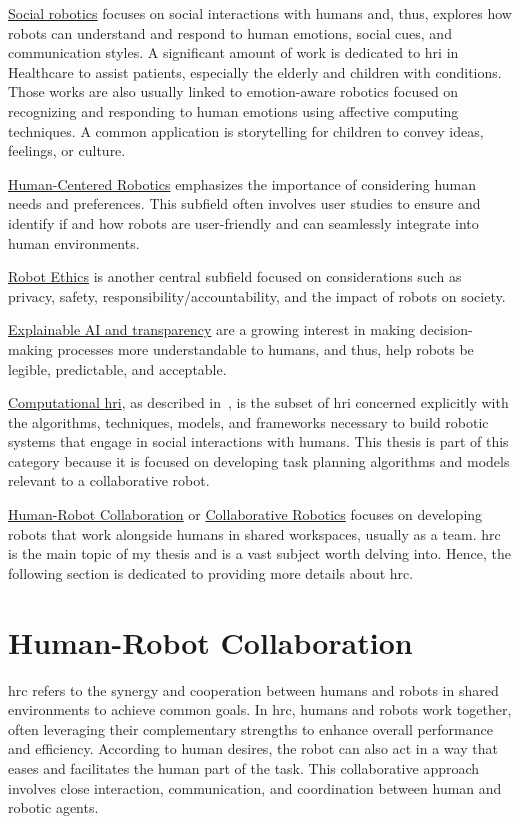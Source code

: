 \uline{Social robotics} focuses on social interactions with humans and, thus, explores how robots can understand and respond to human emotions, social cues, and communication styles.
A significant amount of work is dedicated to \acrshort{hri} in Healthcare to assist patients, especially the elderly and children with conditions. Those works are also usually linked to emotion-aware robotics focused on recognizing and responding to human emotions using affective computing techniques. A common application is storytelling for children to convey ideas, feelings, or culture. 

\uline{Human-Centered Robotics} emphasizes the importance of considering human needs and preferences. This subfield often involves user studies to ensure and identify if and how robots are user-friendly and can seamlessly integrate into human environments.

\uline{Robot Ethics} is another central subfield focused on considerations such as privacy, safety, responsibility/accountability, and the impact of robots on society.

\uline{Explainable AI and transparency} are a growing interest in making decision-making processes more understandable to humans, and thus, help robots be legible, predictable, and acceptable.

\uline{Computational \acrshort{hri}}, as described in~\cite{thomaz_computational_2016}, is the subset of \acrshort{hri} concerned explicitly with the algorithms, techniques, models, and frameworks necessary to build robotic systems that engage in social interactions with humans. This thesis is part of this category because it is focused on developing task planning algorithms and models relevant to a collaborative robot. 

\uline{Human-Robot Collaboration} or \uline{Collaborative Robotics} focuses on developing robots that work alongside humans in shared workspaces, usually as a team. \acrshort{hrc} is the main topic of my thesis and is a vast subject worth delving into. Hence, the following section is dedicated to providing more details about \acrshort{hrc}.

\section{Human-Robot Collaboration}

\acrfull{hrc} refers to the synergy and cooperation between humans and robots in shared environments to achieve common goals. In \acrshort{hrc}, humans and robots work together, often leveraging their complementary strengths to enhance overall performance and efficiency. According to human desires, the robot can also act in a way that eases and facilitates the human part of the task. This collaborative approach involves close interaction, communication, and coordination between human and robotic agents.

